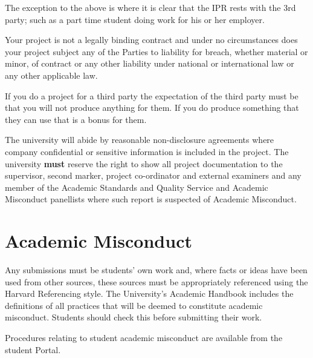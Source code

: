 The exception to the above is where it is clear that the IPR rests with the 3rd party; such as a part
time student doing work for his or her employer.

\begin{tcolorbox}
    Your project is not a legally binding contract and under no circumstances does your project subject any of the Parties to liability for breach, whether material or minor, of contract or any other liability under national or international law or any other applicable law.
\end{tcolorbox}

If you do a project for a third party the expectation of the third party must be that you will not produce anything for them. If you do produce something that they can use that is a bonus for them.

The university will abide by reasonable non-disclosure agreements where company confidential or sensitive information is included in the project. The university \textbf{must} reserve the right to show all project documentation to the supervisor, second marker, project co-ordinator and external examiners and any member of the Academic Standards and Quality Service and Academic Misconduct panellists where such report is suspected of Academic Misconduct.

\section{Academic Misconduct}

Any submissions must be students’ own work and, where facts or ideas have been used from other sources, these sources must be appropriately referenced using the Harvard Referencing style. The University’s Academic Handbook includes the definitions of all practices that will be deemed to constitute academic misconduct. Students should check this before submitting their work.

Procedures relating to student academic misconduct are available from the student Portal.